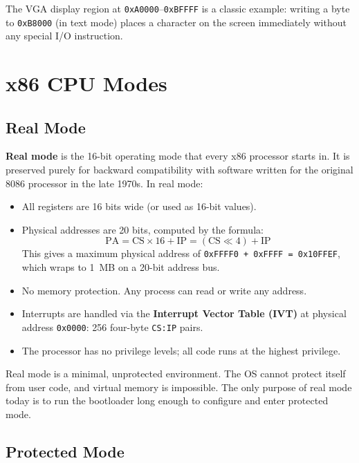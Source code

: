 \documentclass[11pt]{article}
\begin{document}
The VGA display region at \texttt{0xA0000}--\texttt{0xBFFFF} is a classic example: writing a
byte to \texttt{0xB8000} (in text mode) places a character on the screen immediately without
any special I/O instruction.

\section{x86 CPU Modes}

\subsection{Real Mode}

\textbf{Real mode} is the 16-bit operating mode that every x86 processor starts in. It is
preserved purely for backward compatibility with software written for the original 8086
processor in the late 1970s. In real mode:

\begin{itemize}
    \item All registers are 16 bits wide (or used as 16-bit values).
    \item Physical addresses are 20 bits, computed by the formula:
          \[
              \text{PA} = \text{CS} \times 16 + \text{IP} = (\text{CS} \ll 4) + \text{IP}
          \]
          This gives a maximum physical address of \texttt{0xFFFF0 + 0xFFFF = 0x10FFEF},
          which wraps to 1~MB on a 20-bit address bus.
    \item No memory protection. Any process can read or write any address.
    \item Interrupts are handled via the \textbf{Interrupt Vector Table (IVT)} at
          physical address \texttt{0x0000}: 256 four-byte \texttt{CS:IP} pairs.
    \item The processor has no privilege levels; all code runs at the highest privilege.
\end{itemize}

Real mode is a minimal, unprotected environment. The OS cannot protect itself from user code,
and virtual memory is impossible. The only purpose of real mode today is to run the
bootloader long enough to configure and enter protected mode.

\subsection{Protected Mode}
\end{document}
